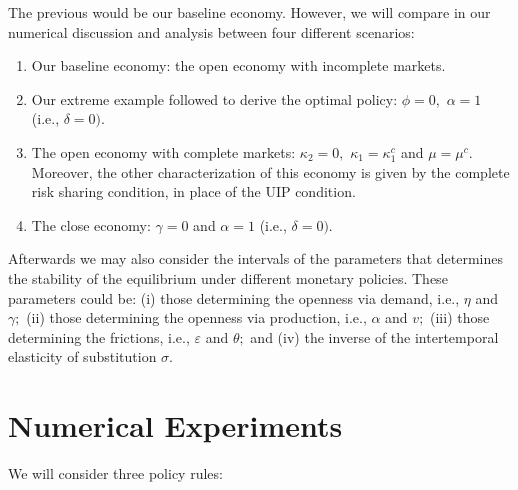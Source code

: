 \documentclass[11pt]{article}
\begin{document}
The previous would be our baseline economy. However, we will compare in our
numerical discussion and analysis between four different scenarios:

\begin{enumerate}
\item Our baseline economy: the open economy with incomplete markets.

\item Our extreme example followed to derive the optimal policy: $\phi =0,$ $%
\alpha =1$ (i.e., $\delta =0)$.

\item The open economy with complete markets: $\kappa _{2}=0,$ $\kappa
_{1}=\kappa _{1}^{c}$ and $\mu =\mu ^{c}.$ Moreover, the other characterization of this economy is given by the complete risk sharing condition, in place of the UIP condition.

\item The close economy: $\gamma =0$ and $\alpha =1$ (i.e., $\delta =0).$
\end{enumerate}

Afterwards we may also consider the intervals of the parameters that
determines the stability of the equilibrium under different monetary
policies. These parameters could be: (i) those determining the openness via
demand, i.e., $\eta $ and $\gamma ;$ (ii) those determining the openness via
production, i.e., $\alpha $ and $v;$ (iii) those determining the frictions,
i.e., $\varepsilon $ and $\theta ;$ and (iv) the inverse of the
intertemporal elasticity of substitution $\sigma$.

\section{Numerical Experiments}

We will consider three policy rules:
\end{document}

